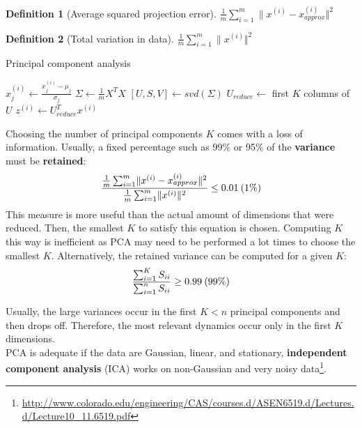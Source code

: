\documentclass{report}
\newtheorem{definition}{Definition}[section]
\begin{document}
\begin{definition}[Average squared projection error]
$\frac{1}{m}\sum_{i=1}^m \lVert x^{(i)}-x_{approx}^{(i)} \Vert^2$
\end{definition}

\begin{definition}[Total variation in data]
$\frac{1}{m}\sum_{i=1}^m \lVert x^{(i)} \Vert^2$
\end{definition}

\begin{algorithm}
\caption{Principal component analysis}
\label{ref:pca}
\begin{algorithmic}
\State $x_j^{(i)} \gets \frac{x_j^{(i)} - \mu_j}{\sigma_j} $ 
\State $\Sigma \gets \frac{1}{m}X^TX$ 
\State $[U,S,V] \gets svd(\Sigma)$ 
\State $U_{reduce} \gets$ first $K$ columns of $U$ 
\State $z^{(i)} \gets U_{reduce}^Tx^{(i)}$ 
\end{algorithmic}
\end{algorithm}

Choosing the number of principal components $K$ comes with a loss of information. Usually, a fixed percentage such as 99\% or 95\% of the {\bf variance} must be {\bf retained}:
\begin{align*}
\frac{\frac{1}{m}\sum_{i=1}^m \lVert x^{(i)}-x_{approx}^{(i)} \Vert^2}{\frac{1}{m}\sum_{i=1}^m \lVert x^{(i)} \Vert^2} \le 0.01\:\mbox(1\%)
\end{align*}
This measure is more useful than the actual amount of dimensions that were reduced. Then, the smallest $K$ to satisfy this equation is chosen. Computing $K$ this way is inefficient as PCA may need to be performed a lot times to choose the smallest $K$. Alternatively, the retained variance can be computed for a given $K$:
\begin{align*}
\frac{\sum_{i=1}^{K}S_{ii}}{\sum_{i=1}^{n}S_{ii}} \ge 0.99\:\mbox(99\%)
\end{align*}

Usually, the large variances occur in the first $K<n$ principal components and then drops off. Therefore, the most relevant dynamics occur only in the first $K$ dimensions. \\
PCA is adequate if the data are Gaussian, linear, and stationary, {\bf independent component analysis} (ICA) works on non-Gaussian and very noisy data\footnote{\url{http://www.colorado.edu/engineering/CAS/courses.d/ASEN6519.d/Lectures.d/Lecture10_11.6519.pdf}}.
\end{document}
